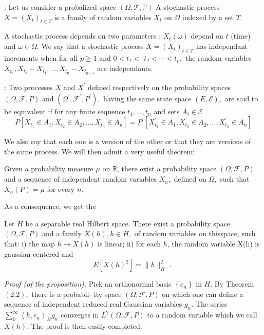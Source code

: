 \begin{definition}:
	Let us consider a probalized space $(\Omega, \mathcal{T}, \mathbb{P})$ A stochastic process  $X=\left(X_{t}\right)_{t \in T}$ is a family of random variables $X_{t}$ on $\Omega$ indexed by a set $T$.

	A stochastic process depends on two parameters : $X_{t}(\omega)$ depend on $t$ (time) and $\omega \in \Omega$.
	We say that a stochastic process $X=\left(X_{t}\right)_{t \in T}$ has independant increments when for all $p \geq 1$ and $0<t_{1}<$
	$t_{2}<\cdots<t_{p},$ the random variables $X_{t_{1}}, X_{t_{2}}-X_{t_{1}}, \ldots, X_{t_{p}}-X_{t_{p-1}}$ are independants.
\end{definition}
\begin{definition}:
	Two processes $X$ and $X^{\prime}$ defined respectively on the probability spaces $(\Omega, \mathscr{F}, P)$ and $\left(\Omega^{\prime}, \mathcal{F}^{\prime}, P^{\prime}\right),$ having the same state space $(E, \mathscr{E}),$ are said
	to be equivalent if for any finite sequence $t_{1}, \ldots, t_{n}$ and sets $A_{i} \in \mathscr{E}$
	\[
	P\left[X_{t_{1}} \in A_{1}, X_{t_{2}} \in A_{2}, \ldots, X_{t_{n}} \in A_{n}\right]=P^{\prime}\left[X_{t_{1}}^{\prime} \in A_{1}, X_{t_{2}}^{\prime} \in A_{2}, \ldots, X_{t_{n}}^{\prime} \in A_{n}\right]
	\]
\end{definition}
We also say that each one is a version of the other or that they are versions of the same process.
We will then admit a very useful theorem:
\begin{theorem}
	Given a probability measure $\mu$ on $\mathbb{R}$, there exist a probability
	space $(\Omega, \mathscr{F}, P)$ and a sequence of independent random variables $X_{n},$ defined on
	$\Omega,$ such that $X_{n}(P)=\mu$ for every $n .$
\end{theorem}
As a consequence, we get the\
\begin{proposition}
	Let $H$ be a separable real Hilbert space. There exist a probability space $(\Omega, \mathscr{F}, P)$ and a family $X(h), h \in H,$ of random variables on thisspace, such that:
	i) the map $h \rightarrow X(h)$ is linear;
	ii) for each $h$, the random variable X(h) is gaussian centered and
	$$
	E\left[X(h)^{2}\right]=\|h\|_{H}^{2} \text { . }
	$$
\end{proposition}
\textit{Proof (of the proposition):} Pick an orthonormal basis $\left\{e_{n}\right\}$ in $H .$ By Theorem $(2.2),$ there is a probabil-
ity space $(\Omega, \mathscr{F}, P)$ on which one can define a sequence of independent reduced
real Gaussian variables $g_{n} .$ The series $\sum_{0}^{\infty}\left\langle h, e_{n}\right\rangle_{H} g_{n}$ converges in $L^{2}(\Omega, \mathscr{F}, P)$
to a random variable which we call $X(h) .$ The proof is then easily completed.

